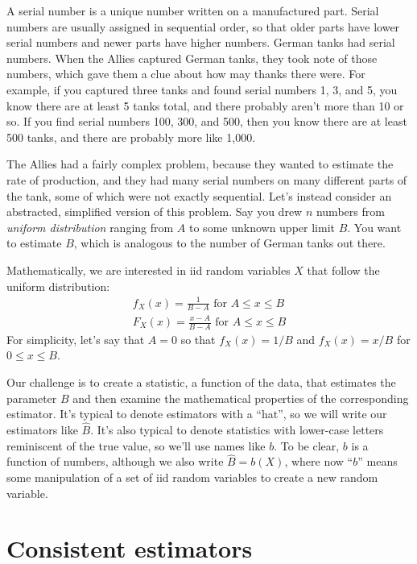 A serial number is a unique number written on a manufactured part. Serial numbers
are usually assigned in sequential order, so that older parts have lower
serial numbers and newer parts have higher numbers. German tanks had serial
numbers. When
the Allies captured German tanks, they took note of those numbers, which gave
them a clue about how may thanks there were. For example, if you captured three
tanks and found serial numbers 1, 3, and 5, you know there are at least 5 tanks
total, and there probably aren't more than 10 or so. If you find serial numbers
100, 300, and 500, then you know there are at least 500 tanks, and there are
probably more like 1,000.

The Allies had a fairly complex problem, because they wanted to estimate the
rate of production, and they had many serial numbers on many different parts
of the tank, some of which were not
exactly sequential. Let's instead consider an abstracted, simplified version of
this problem. Say you drew $n$ numbers from \emph{uniform distribution} ranging
from $A$ to some unknown upper limit $B$. You want to estimate $B$, which is
analogous to the number of German tanks out there.

Mathematically, we are interested in iid random variables $X$ that follow the
uniform distribution:
\begin{gather*}
    f_X(x) = \frac{1}{B-A} \text{ for } A \leq x \leq B \\
    F_X(x) = \frac{x-A}{B-A} \text{ for } A \leq x \leq B
\end{gather*}
For simplicity, let's say that $A=0$ so that $f_X(x) = 1/B$ and $f_X(x) = x/B$
for $0 \leq x \leq B$.

Our challenge is to create a statistic, a function of the data, that estimates
the parameter $B$ and then examine the mathematical properties of the corresponding estimator. It's typical to denote estimators with a
``hat'', so we will write our estimators like $\hat{B}$. It's also typical to denote
statistics with lower-case letters reminiscent of the true value, so we'll
use names like $b$. To be clear, $b$ is a function of numbers, although we also
write $\hat{B} = b(X)$, where now ``$b$'' means some manipulation of a set of iid
random variables to create a new random variable.

\section{Consistent estimators}

